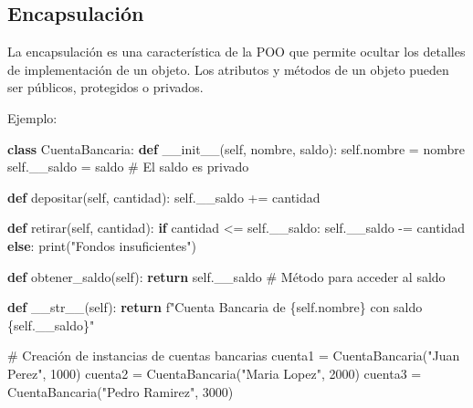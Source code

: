 \documentclass[
  a4paper,
  DIV=11,
  numbers=noendperiod,
  onepage,
  openany]{scrreprt}
\newenvironment{Shaded}{\begin{snugshade}}{\end{snugshade}}
\newcommand{\BuiltInTok}[1]{\textcolor[rgb]{0.00,0.23,0.31}{#1}}
\newcommand{\CommentTok}[1]{\textcolor[rgb]{0.37,0.37,0.37}{#1}}
\newcommand{\ControlFlowTok}[1]{\textcolor[rgb]{0.00,0.23,0.31}{\textbf{#1}}}
\newcommand{\DecValTok}[1]{\textcolor[rgb]{0.68,0.00,0.00}{#1}}
\newcommand{\FunctionTok}[1]{\textcolor[rgb]{0.28,0.35,0.67}{#1}}
\newcommand{\KeywordTok}[1]{\textcolor[rgb]{0.00,0.23,0.31}{\textbf{#1}}}
\newcommand{\NormalTok}[1]{\textcolor[rgb]{0.00,0.23,0.31}{#1}}
\newcommand{\OperatorTok}[1]{\textcolor[rgb]{0.37,0.37,0.37}{#1}}
\newcommand{\SpecialCharTok}[1]{\textcolor[rgb]{0.37,0.37,0.37}{#1}}
\newcommand{\SpecialStringTok}[1]{\textcolor[rgb]{0.13,0.47,0.30}{#1}}
\newcommand{\StringTok}[1]{\textcolor[rgb]{0.13,0.47,0.30}{#1}}
\newcommand{\VariableTok}[1]{\textcolor[rgb]{0.07,0.07,0.07}{#1}}
\begin{document}
\subsection{Encapsulación}\label{encapsulaciuxf3n}

La encapsulación es una característica de la POO que permite ocultar los
detalles de implementación de un objeto. Los atributos y métodos de un
objeto pueden ser públicos, protegidos o privados.

Ejemplo:

\begin{Shaded}
\begin{Highlighting}[]
\KeywordTok{class}\NormalTok{ CuentaBancaria:}
    \KeywordTok{def} \FunctionTok{\_\_init\_\_}\NormalTok{(}\VariableTok{self}\NormalTok{, nombre, saldo):}
        \VariableTok{self}\NormalTok{.nombre }\OperatorTok{=}\NormalTok{ nombre}
        \VariableTok{self}\NormalTok{.\_\_saldo }\OperatorTok{=}\NormalTok{ saldo  }\CommentTok{\# El saldo es privado}

    \KeywordTok{def}\NormalTok{ depositar(}\VariableTok{self}\NormalTok{, cantidad):}
        \VariableTok{self}\NormalTok{.\_\_saldo }\OperatorTok{+=}\NormalTok{ cantidad}

    \KeywordTok{def}\NormalTok{ retirar(}\VariableTok{self}\NormalTok{, cantidad):}
        \ControlFlowTok{if}\NormalTok{ cantidad }\OperatorTok{\textless{}=} \VariableTok{self}\NormalTok{.\_\_saldo:}
            \VariableTok{self}\NormalTok{.\_\_saldo }\OperatorTok{{-}=}\NormalTok{ cantidad}
        \ControlFlowTok{else}\NormalTok{:}
            \BuiltInTok{print}\NormalTok{(}\StringTok{"Fondos insuficientes"}\NormalTok{)}

    \KeywordTok{def}\NormalTok{ obtener\_saldo(}\VariableTok{self}\NormalTok{):}
        \ControlFlowTok{return} \VariableTok{self}\NormalTok{.\_\_saldo  }\CommentTok{\# Método para acceder al saldo}

    \KeywordTok{def} \FunctionTok{\_\_str\_\_}\NormalTok{(}\VariableTok{self}\NormalTok{):}
        \ControlFlowTok{return} \SpecialStringTok{f"Cuenta Bancaria de }\SpecialCharTok{\{}\VariableTok{self}\SpecialCharTok{.}\NormalTok{nombre}\SpecialCharTok{\}}\SpecialStringTok{ con saldo }\SpecialCharTok{\{}\VariableTok{self}\SpecialCharTok{.}\NormalTok{\_\_saldo}\SpecialCharTok{\}}\SpecialStringTok{"}


\CommentTok{\# Creación de instancias de cuentas bancarias}
\NormalTok{cuenta1 }\OperatorTok{=}\NormalTok{ CuentaBancaria(}\StringTok{"Juan Perez"}\NormalTok{, }\DecValTok{1000}\NormalTok{)}
\NormalTok{cuenta2 }\OperatorTok{=}\NormalTok{ CuentaBancaria(}\StringTok{"Maria Lopez"}\NormalTok{, }\DecValTok{2000}\NormalTok{)}
\NormalTok{cuenta3 }\OperatorTok{=}\NormalTok{ CuentaBancaria(}\StringTok{"Pedro Ramirez"}\NormalTok{, }\DecValTok{3000}\NormalTok{)}


\end{Highlighting}
\end{Shaded}
\end{document}
